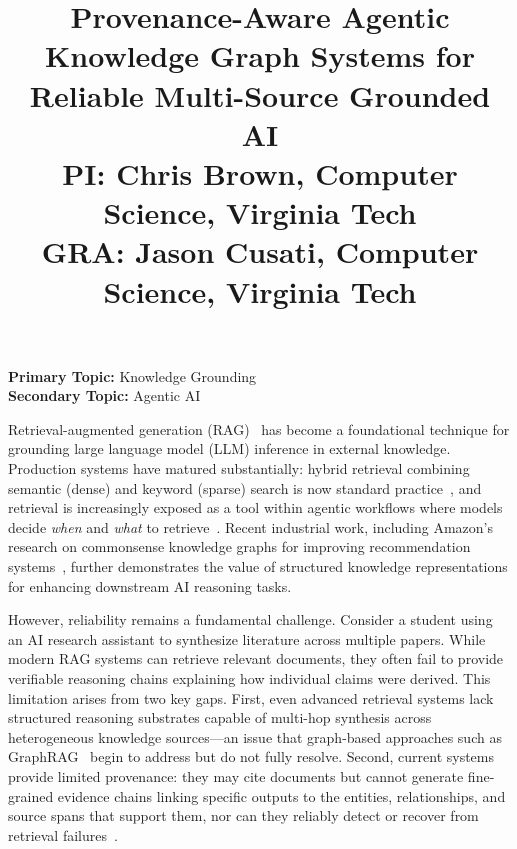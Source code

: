 \documentclass[conference, 10pt]{IEEEtran}
\title{Provenance-Aware Agentic Knowledge Graph Systems for Reliable Multi-Source Grounded AI\\ \vspace{0.1cm}
{\normalsize PI: Chris Brown, Computer Science, Virginia Tech\\\vspace{-0.55cm}
GRA: Jason Cusati, Computer Science, Virginia Tech}\vspace{-1.25cm}}
\author{}
\date{}
\begin{document}
\maketitle
\thispagestyle{empty}

\vspace{-1.5em}

\noindent\textbf{Primary Topic:} Knowledge Grounding \hfill \\
\textbf{Secondary Topic:} Agentic AI

\vspace{0.5em}

Retrieval-augmented generation (RAG)~\cite{Lewis2020RAG} has become a foundational technique for grounding large language model (LLM) inference in external knowledge. Production systems have matured substantially: hybrid retrieval combining semantic (dense) and keyword (sparse) search is now standard practice~\cite{AWSBedrockHybridSearch2024}, and retrieval is increasingly exposed as a tool within agentic workflows where models decide \textit{when} and \textit{what} to retrieve~\cite{OpenAIFunctionCalling2025}. Recent industrial work, including Amazon's research on commonsense knowledge graphs for improving recommendation systems~\cite{Yu2024COSMO}, further demonstrates the value of structured knowledge representations for enhancing downstream AI reasoning tasks.

However, reliability remains a fundamental challenge. Consider a student using an AI research assistant to synthesize literature across multiple papers. While modern RAG systems can retrieve relevant documents, they often fail to provide verifiable reasoning chains explaining how individual claims were derived. This limitation arises from two key gaps. First, even advanced retrieval systems lack structured reasoning substrates capable of multi-hop synthesis across heterogeneous knowledge sources---an issue that graph-based approaches such as GraphRAG~\cite{Edge2024GraphRAG} begin to address but do not fully resolve. Second, current systems provide limited provenance: they may cite documents but cannot generate fine-grained evidence chains linking specific outputs to the entities, relationships, and source spans that support them, nor can they reliably detect or recover from retrieval failures~\cite{Yan2024CRAG,Ji2023HallucinationSurvey}.
\end{document}
